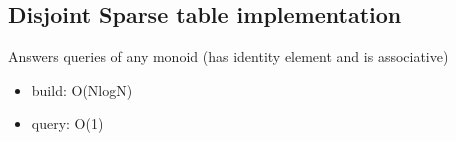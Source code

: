 \subsection{Disjoint Sparse table implementation}
Answers queries of any monoid (has identity element and is associative)

\begin{itemize}
  \item build: O(NlogN)
  \item query: O(1)
\end{itemize}
